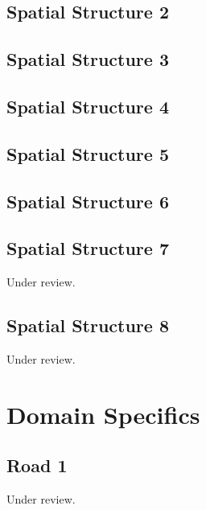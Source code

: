 \documentclass{scrartcl}
\begin{document}
\subsection{Spatial Structure 2}
\label{sec:spatial_2}
\clearpage

\subsection{Spatial Structure 3}
\label{sec:spatial_3}
\clearpage

\subsection{Spatial Structure 4}
\label{sec:spatial_4}
\clearpage

\subsection{Spatial Structure 5}
\label{sec:spatial_5}
\clearpage

\subsection{Spatial Structure 6}
\label{sec:spatial_6}
\clearpage

\subsection{Spatial Structure 7} %
\label{sec:spatial_7}
Under review.%
\clearpage

\subsection{Spatial Structure 8} %
\label{sec:spatial_8}
Under review.%
\clearpage

\section{Domain Specifics}
\label{sec:domain_specifics}

\subsection{Road 1}  %
\label{sec:road_1}
Under review.%
\clearpage
\end{document}
